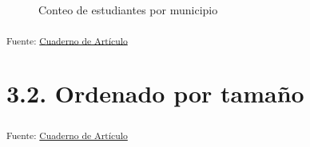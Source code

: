 \documentclass[
  12pt]{article}
\begin{document}
\begin{figure}[H]


\caption{\label{fig-mun2024cant}Conteo de estudiantes por municipio}

\end{figure}%

\textsubscript{Fuente:
\href{https://sociest.github.io/ue-report/index.ipynb.html}{Cuaderno de
Artículo}}

\section{3.2. Ordenado por tamaño}\label{ordenado-por-tamauxf1o}

\textsubscript{Fuente:
\href{https://sociest.github.io/ue-report/index.ipynb.html}{Cuaderno de
Artículo}}
\end{document}
